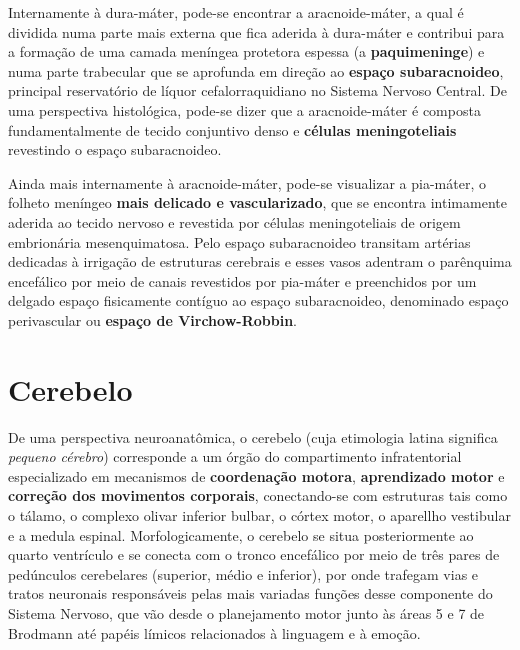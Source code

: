 \documentclass[
]{book}
\theoremstyle{definition}
\theoremstyle{definition}
\theoremstyle{definition}
\theoremstyle{definition}
\theoremstyle{remark}
\begin{document}
Internamente à dura-máter, pode-se encontrar a aracnoide-máter, a qual é dividida numa parte mais externa que fica aderida à dura-máter e contribui para a formação de uma camada meníngea protetora espessa (a \textbf{paquimeninge}) e numa parte trabecular que se aprofunda em direção ao \textbf{espaço subaracnoideo}, principal reservatório de líquor cefalorraquidiano no Sistema Nervoso Central. De uma perspectiva histológica, pode-se dizer que a aracnoide-máter é composta fundamentalmente de tecido conjuntivo denso e \textbf{células meningoteliais} revestindo o espaço subaracnoideo.

Ainda mais internamente à aracnoide-máter, pode-se visualizar a pia-máter, o folheto meníngeo \textbf{mais delicado e vascularizado}, que se encontra intimamente aderida ao tecido nervoso e revestida por células meningoteliais de origem embrionária mesenquimatosa. Pelo espaço subaracnoideo transitam artérias dedicadas à irrigação de estruturas cerebrais e esses vasos adentram o parênquima encefálico por meio de canais revestidos por pia-máter e preenchidos por um delgado espaço fisicamente contíguo ao espaço subaracnoideo, denominado espaço perivascular ou \textbf{espaço de Virchow-Robbin}.

\hypertarget{cerebelo}{%
\chapter{Cerebelo}\label{cerebelo}}

De uma perspectiva neuroanatômica, o cerebelo (cuja etimologia latina significa \emph{pequeno cérebro}) corresponde a um órgão do compartimento infratentorial especializado em mecanismos de \textbf{coordenação motora}, \textbf{aprendizado motor} e \textbf{correção dos movimentos corporais}, conectando-se com estruturas tais como o tálamo, o complexo olivar inferior bulbar, o córtex motor, o aparellho vestibular e a medula espinal. Morfologicamente, o cerebelo se situa posteriormente ao quarto ventrículo e se conecta com o tronco encefálico por meio de três pares de pedúnculos cerebelares (superior, médio e inferior), por onde trafegam vias e tratos neuronais responsáveis pelas mais variadas funções desse componente do Sistema Nervoso, que vão desde o planejamento motor junto às áreas 5 e 7 de Brodmann até papéis límicos relacionados à linguagem e à emoção.
\end{document}

